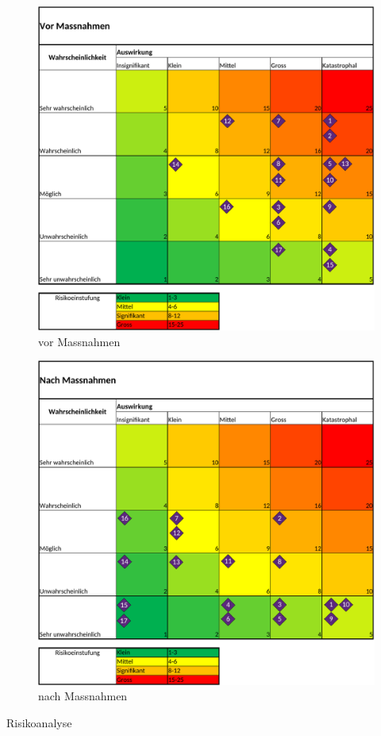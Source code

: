 \begin{table}[H]
\begin{subfigure}{0.5\textwidth}
\includegraphics[width=0.99\linewidth]{assets/Risikoanalyse_vor_Massnahmen.pdf}
\caption{vor Massnahmen}
\label{table:risk-before}
\end{subfigure}
\begin{subfigure}{0.5\textwidth}
\includegraphics[width=0.99\linewidth]{assets/Risikoanalyse_nach_Massnahmen.pdf}
\caption{nach Massnahmen}
\label{table:risk-after}
\end{subfigure}
\caption{Risikoanalyse}
\label{table:risk-table}
\end{table}

